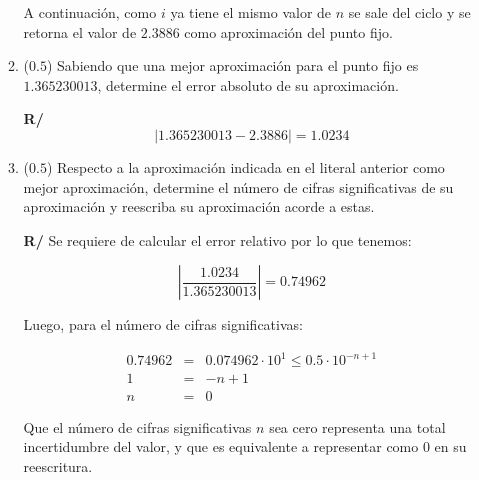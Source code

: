 \documentclass[12pt]{article}
\begin{document}
\begin{enumerate}[leftmargin=*,widest=9]
\begin{enumerate}[label=\alph*]
A continuación, como \(i\) ya tiene el mismo valor de \(n\) se sale del ciclo y se retorna el valor de \(2.3886\)
como aproximación del punto fijo.

    \item (\(0.5\)) Sabiendo que una mejor aproximación para el punto fijo es \(1.365230013\), determine el error absoluto de su aproximación.

    \textbf{R/} \[\vert 1.365230013 -  2.3886 \vert = 1.0234 \]

    \item (\(0.5\)) Respecto a la aproximación indicada en el literal anterior como mejor aproximación, determine el número de cifras significativas de su aproximación y reescriba su aproximación acorde a estas.

\textbf{R/} Se requiere de calcular el error relativo por lo que tenemos:

\[ \left \vert \frac{1.0234}{1.365230013} \right\vert = 0.74962\]

Luego, para el número de cifras significativas:

\begin{eqnarray*}
0.74962 &=& 0.074962\cdot 10^1 \leq 0.5 \cdot 10^{-n + 1}\\
1 &=& - n + 1\\
n &=& 0
\end{eqnarray*}

Que el número de cifras significativas \(n\) sea cero representa una total incertidumbre del valor, y que es equivalente a representar como \(0\) en su reescritura.



    \end{enumerate}


\end{enumerate}
\end{document}
